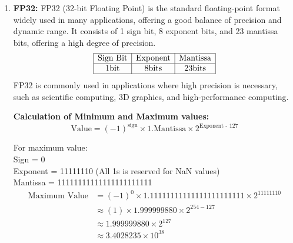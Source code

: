 \documentclass{ioereport}
\begin{document}
\begin{enumerate}[label=\textbf{\roman*.}]
    \item \textbf{FP32:}
    FP32 (32-bit Floating Point) is the standard floating-point format widely used in many applications, offering a good balance of precision and dynamic range. It consists of 1 sign bit, 8 exponent bits, and 23 mantissa bits, offering a high degree of precision.
    \[
    \begin{array}{|c|c|c|}
        \hline
        \text{Sign Bit} & \text{Exponent} & \text{Mantissa} \\
        \hline
        1 \text{bit} & 8 \text{bits} & 23 \text{bits} \\
        \hline
    \end{array}
    \]
    FP32 is commonly used in applications where high precision is necessary, such as scientific computing, 3D graphics, and high-performance computing.

    \textbf{Calculation of Minimum and Maximum values:}
    \[
    \text{Value} = (-1)^{\text{sign}} \times 1.\text{Mantissa} \times 2^{\text{Exponent - 127}}
    \]

    For maximum value:\\
    Sign = 0 \\
    Exponent = 11111110 (All 1s is reserved for NaN values) \\
    Mantissa = 11111111111111111111111 
    \[
        \begin{aligned}
            \text{Maximum Value} &= (-1)^{0} \times 1.11111111111111111111111 \times 2^{11111110} \\
            & \approx (1) \times 1.999999880 \times 2^{254 - 127} \\
            & \approx 1.999999880 \times 2^{127} \\
            & \approx 3.4028235 \times 10^{38}
        \end{aligned}
    \]


\end{enumerate}
\end{document}
